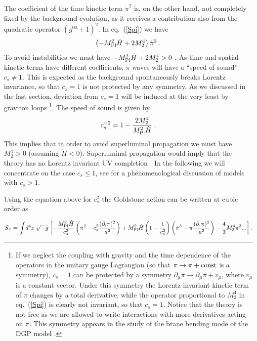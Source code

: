 \documentclass[12pt,letterpaper]{article}
\def\be{\begin{eqnarray}}
\def\ee{\end{eqnarray}}
\begin{document}
{The coefficient of the time kinetic term $\dot{\pi}^2$ is, on the other hand, not completely fixed by the background evolution, as it receives a contribution also from the quadratic operator $(g^{00}+1)^2$. In eq.~(\ref{Spi}) we have 
\begin{equation}
\left(-M_{\rm Pl}^2 \dot{H} + 2 M_2^4 \right) \dot\pi^2 \;.
\end{equation}
To avoid instabilities we must have $-M_{\rm Pl}^2 \dot{H} + 2 M_2^4 >0$ .
As time and spatial kinetic terms have different coefficients, $\pi$
waves will have a ``speed of sound'' $c_s \neq 1$. This is expected as
the background spontaneously breaks Lorentz invariance, so that
$c_s=1$ is not protected by any symmetry. As we discussed in the last
section, deviation from $c_s=1$ will be induced at the very least by
graviton loops \footnote{If we neglect the coupling with gravity and
the time dependence of the operators in the unitary gauge Lagrangian
(so that $\pi \to \pi + {\rm const}$ is a symmetry),
$c_s=1$ can be protected by a symmetry $\partial_\mu\pi \to
\partial_\mu\pi + v_\mu$, where $v_\mu$ is a constant vector. Under
this symmetry the Lorentz invariant kinetic term of $\pi$ changes by a
total derivative, while the operator proportional to $M_2^4$ in
eq.~(\ref{Spi}) is clearly not invariant, so that $c_s=1$. Notice that
the theory is not free as we are allowed to write interactions with
more derivatives acting on $\pi$. This symmetry appears in the study of the brane
bending mode of the DGP model \cite{Adams:2006sv}.}.
The speed of sound is given by
\be
c_s^{-2} = 1-\frac{2 M_2^4}{M_{\rm Pl}^2 \dot H} \;.
\ee
This implies that in order to avoid superluminal propagation we must
have $M_2^4 >0$ (assuming $\dot H <0$). Superluminal propagation would
imply that the theory has no Lorentz invariant UV completion \cite{Adams:2006sv}. In the following we will concentrate on
the case $c_s \leq 1$, see \cite{Mukhanov:2005bu} for a phenomenological discussion of models
with $c_s > 1$.

Using the equation above for $c_s^2$ the Goldstone action can be
written at cubic order as

\begin{eqnarray}\label{Spi_cs}
S_{\rm \pi} = \int \!  d^4 x  \:  \sqrt{- g} \left[
-\frac{M^2_{\rm Pl} \dot{H}}{c^2_s} \left(\dot\pi^2-c^2_s
\frac{(\partial_i\pi)^2}{a^2}\right)
+M_{\rm Pl}^2 \dot H \left(1-\frac{1}{c^2_s}\right)
\left(\dot{\pi}^3-\dot\pi\frac{(\partial_i\pi)^2}{a^2}
\right)- \frac43 M_3^4 \dot\pi^3... \right].
\end{eqnarray}

}
\end{document}
